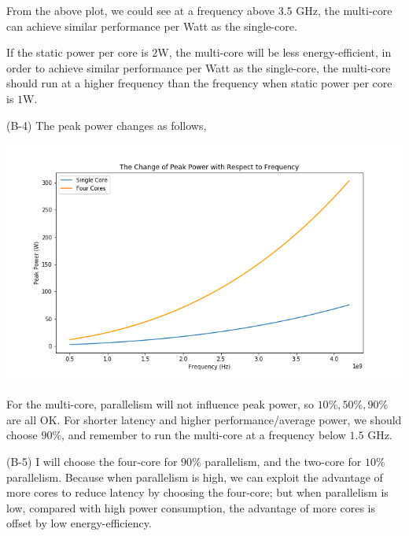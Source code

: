 \documentclass[11pt]{article}
\begin{document}
\begin{solution}
\item From the above plot, we could see at a frequency above $3.5$ GHz, the multi-core can achieve similar performance per Watt as the single-core.
\item If the static power per core is $2$W, the multi-core will be less energy-efficient, in order to achieve similar performance per Watt as the single-core, the multi-core should run at a higher frequency than the frequency when static power per core is $1$W.
\pagebreak
\item (B-4) The peak power changes as follows,
\begin{center}
\includegraphics[width=15cm]{B1_2.png}
\end{center}
\item For the multi-core, parallelism will not influence peak power, so $10\%, 50\%, 90\%$ are all OK. For shorter latency and higher performance/average power, we should choose $90\%$, and remember to run the multi-core at a frequency below $1.5$ GHz.
\item (B-5) I will choose the four-core for $90$\% parallelism, and the two-core for $10$\% parallelism. Because when parallelism is high, we can exploit the advantage of more cores to reduce latency by choosing the four-core; but when parallelism is low, compared with high power consumption, the advantage of more cores is offset by low energy-efficiency.
\end{solution}
\end{document}
